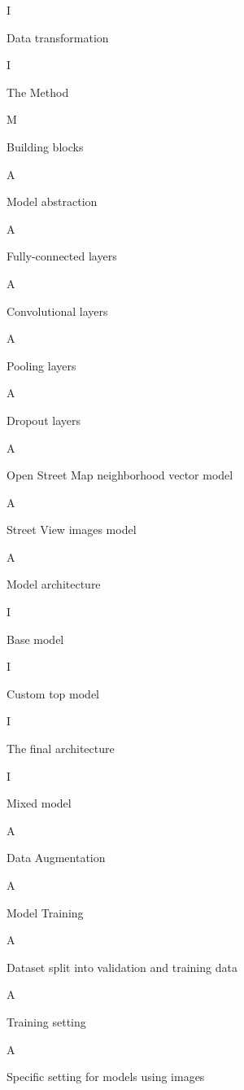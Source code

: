 I

\seccc Data transformation

I

\chap The Method

M

\sec Building blocks 

A

\secc Model abstraction

A

\secc Fully-connected layers

A

\secc Convolutional layers

A

\secc Pooling layers

A

\secc Dropout layers

A

\sec Open Street Map neighborhood vector model 

A

\sec Street View images model 

A

\secc Model architecture

I

\seccc Base model

I

\seccc Custom top model

I

\seccc The final architecture

I

\sec Mixed model 

A

\sec Data Augmentation 

A

\sec Model Training 

A

\secc Dataset split into validation and training data 

A

\secc Training setting 

A

\secc Specific setting for models using images 

